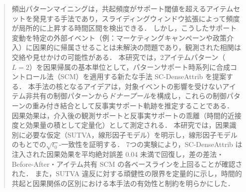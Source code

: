 \begin{abstract}
頻出パターンマイニングは，共起頻度がサポート閾値を超えるアイテムセットを発見する手法であり，スライディングウィンドウ拡張によって頻度が局所的に上昇する時間区間を検出できる．
しかし，こうしたサポート変動を特定の外部イベント（例：マーケティングキャンペーンや政策介入）に因果的に帰属させることは未解決の問題であり，観測された相関は交絡や見せかけの可能性がある．
本研究では，2アイテムパターン（$L=2$）を因果帰属の基本単位として，パターンサポート時系列に合成コントロール法（SCM）を適用する新たな手法 SC-DenseAttrib を提案する．
本手法の核となるアイデアは，対象イベントの影響を受けないアイテム非共有の制御パターンから\emph{ドナープール}を構成し，これらの制御パターンの重み付き結合として反事実サポート軌跡を推定することである．
因果効果は，介入後の観測サポートと反事実サポートの乖離（時間的近接度と効果量の積として定量化）として測定される．
本研究では，因果識別に必要な仮定（SUTVA，線形因子モデル）を明示し，線形因子モデルのもとでの$\sqrt{t_0}$-一致性を証明する．
7つの実験により，SC-DenseAttrib は注入された因果効果を平均絶対誤差 0.04 未満で回復し，差の差法・Before-After・アイテム共有 SCM の各ベースラインを上回ることが確認された．
また，SUTVA 違反に対する頑健性の限界を定量的に示し，時間的共起と因果関係の区別における本手法の有効性と制約を明らかにした．
\end{abstract}
